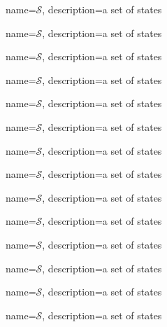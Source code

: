 { 
	name={$\mathcal{S}$},
	description={a set of states}
}

{ 
	name={$\mathcal{S}$},
	description={a set of states}
}

{ 
	name={$\mathcal{S}$},
	description={a set of states}
}

{ 
	name={$\mathcal{S}$},
	description={a set of states}
}

{ 
	name={$\mathcal{S}$},
	description={a set of states}
}

{ 
	name={$\mathcal{S}$},
	description={a set of states}
}

{ 
	name={$\mathcal{S}$},
	description={a set of states}
}

{ 
	name={$\mathcal{S}$},
	description={a set of states}
}

{ 
	name={$\mathcal{S}$},
	description={a set of states}
}

{ 
	name={$\mathcal{S}$},
	description={a set of states}
}

{ 
	name={$\mathcal{S}$},
	description={a set of states}
}

{ 
	name={$\mathcal{S}$},
	description={a set of states}
}

{ 
	name={$\mathcal{S}$},
	description={a set of states}
}

{ 
	name={$\mathcal{S}$},
	description={a set of states}
}




